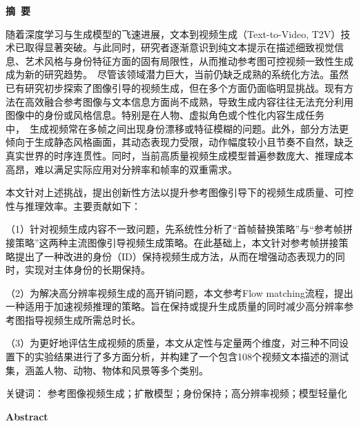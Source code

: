 \cleardoublepage{}
\begin{center}
    \bfseries {} 摘~要
\end{center}

随着深度学习与生成模型的飞速进展，文本到视频生成（Text-to-Video, T2V）技术已取得显著突破。与此同时，研究者逐渐意识到纯文本提示在描述细致视觉信息、艺术风格与身份特征方面的固有局限性，从而推动参考图可控视频一致性生成成为新的研究趋势。\
尽管该领域潜力巨大，当前仍缺乏成熟的系统化方法。虽然已有研究初步探索了图像引导的视频生成，但在多个方面仍面临明显挑战。现有方法在高效融合参考图像与文本信息方面尚不成熟，导致生成内容往往无法充分利用图像中的身份或风格信息。特别是在人物、虚拟角色或个性化内容生成任务中，\
生成视频常在多帧之间出现身份漂移或特征模糊的问题。此外，部分方法更倾向于生成静态风格画面，其动态表现力受限，动作幅度较小且节奏不自然，缺乏真实世界的时序连贯性。同时，当前高质量视频生成模型普遍参数庞大、推理成本高昂，难以满足实际应用对分辨率和帧率的双重需求。

本文针对上述挑战，提出创新性方法以提升参考图像引导下的视频生成质量、可控性与推理效率。主要贡献如下：

（1）针对视频生成内容不一致问题，先系统性分析了“首帧替换策略”与“参考帧拼接策略”这两种主流图像引导视频生成策略。在此基础上，本文针对参考帧拼接策略提出了一种改进的身份（ID）保持视频生成方法，从而在增强动态表现力的同时，实现对主体身份的长期保持。

（2）为解决高分辨率视频生成的高开销问题，本文参考Flow matching流程，提出一种适用于加速视频推理的策略。旨在保持或提升生成质量的同时减少高分辨率参考图指导视频生成所需总时长。

（3）为更好地评估生成视频的质量，本文从定性与定量两个维度，对三种不同设置下的实验结果进行了多方面分析，并构建了一个包含108个视频文本描述的测试集，涵盖人物、动物、物体和风景等多个类别。

\vspace{0.5cm} %

\noindent
关键词： 参考图像视频生成；扩散模型；身份保持；高分辨率视频；模型轻量化
\cleardoublepage{}
\begin{center}
    \bfseries {} Abstract
\end{center}

